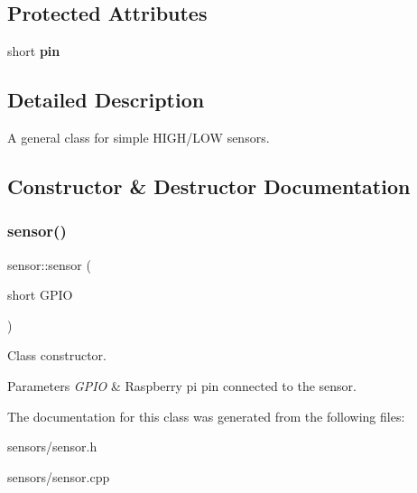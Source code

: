 \subsection*{Protected Attributes}
\begin{DoxyCompactItemize}
\item 
\mbox{\label{classsensor_a4fb74b2b7aedb1554825444387c0d017}} 
short {\bfseries pin}
\end{DoxyCompactItemize}


\subsection{Detailed Description}
A general class for simple H\+I\+G\+H/\+L\+OW sensors. 

\subsection{Constructor \& Destructor Documentation}
\mbox{\label{classsensor_a3341a98b9c6b4f0e0234f205941f4342}} 
\subsubsection{\texorpdfstring{sensor()}{sensor()}}
{\footnotesize\ttfamily sensor\+::sensor (\begin{DoxyParamCaption}\item[{short}]{G\+P\+IO }\end{DoxyParamCaption})}



Class constructor. 


\begin{DoxyParams}{Parameters}
{\em G\+P\+IO} & Raspberry pi pin connected to the sensor. \\
\hline
\end{DoxyParams}


The documentation for this class was generated from the following files\+:\begin{DoxyCompactItemize}
\item 
sensors/sensor.\+h\item 
sensors/sensor.\+cpp\end{DoxyCompactItemize}

